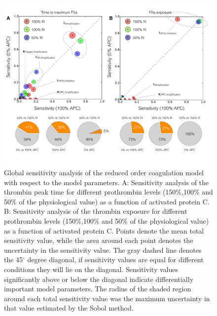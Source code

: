 \documentclass[processes,article,received,moreauthors,pdftex,12pt,a4paper]{mdpi}
\begin{document}
\begin{figure}[H]
\centering
\includegraphics[width=1.0\textwidth]{./figs/Figure-9-Sensitivity.pdf}
\caption{Global sensitivity analysis of the reduced order coagulation model with respect to the model parameters.
A: Sensitivity analysis of the thrombin peak time for different prothrombin levels (150\%,100\% and 50\% of the physiological value) as a function of activated protein C. 
B: Sensitivity analysis of the thrombin exposure for different prothrombin levels (150\%,100\% and 50\% of the physiological value) as a function of activated protein C. 
Points denote the mean total sensitivity value, while the area around each point denotes the uncertainty in the sensitivity value. 
The gray dashed line denotes the 45$^{\circ}$ degree diagonal, if sensitivity values are equal for different conditions they will lie on the diagonal.  
Sensitivity values significantly above or below the diagonal indicate differentially important model parameters. 
The radius of the shaded region around each total sensitivity value was the maximum uncertainty in that value estimated by the Sobol method. 
}\label{fig-sensitivity}
\end{figure}

\end{document}
